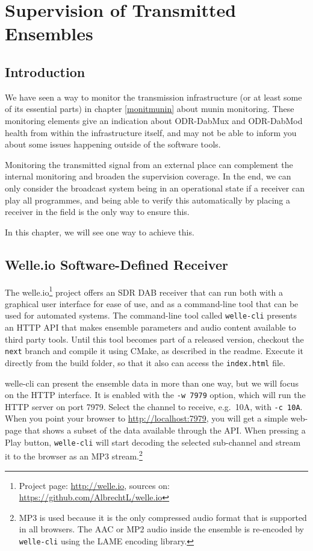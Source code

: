 \section{Supervision of Transmitted Ensembles}
\subsection{Introduction}
We have seen a way to monitor the transmission infrastructure (or at least some
of its essential parts) in chapter \ref{monitmunin} about munin monitoring.
These monitoring elements give an indication about ODR-DabMux and ODR-DabMod
health from within the infrastructure itself, and may not be able to inform you
about some issues happening outside of the software tools.

Monitoring the transmitted signal from an external place can complement the
internal monitoring and broaden the supervision coverage. In the end, we can
only consider the broadcast system being in an operational state if a receiver
can play all programmes, and being able to verify this automatically by placing
a receiver in the field is the only way to ensure this.

In this chapter, we will see one way to achieve this.

\subsection{Welle.io Software-Defined Receiver}
The welle.io\footnote{Project page: \url{http://welle.io}, sources on:
\url{https://github.com/AlbrechtL/welle.io}} project offers an SDR DAB receiver
that can run both with a graphical user interface for ease of use, and as a
command-line tool that can be used for automated systems.
The command-line tool called \texttt{welle-cli} presents an HTTP API that makes
ensemble parameters and audio content available to third party tools. Until this
tool becomes part of a released version, checkout the \texttt{next} branch and
compile it using CMake, as described in the readme. Execute it directly from the
build folder, so that it also can access the \texttt{index.html} file.

welle-cli can present the ensemble data in more than one way, but we will focus
on the HTTP interface. It is enabled with the \texttt{-w 7979} option, which
will run the HTTP server on port 7979. Select the channel to receive, e.g.~10A, with
\texttt{-c 10A}.
When you point your browser to \url{http://localhost:7979}, you will get a
simple web-page that shows a subset of the data available through the API. When
pressing a Play button, \texttt{welle-cli} will start decoding the selected
sub-channel and stream it to the browser as an MP3 stream.\footnote{MP3 is used
because it is the only compressed audio format that is supported in all
browsers. The AAC or MP2 audio inside the ensemble is re-encoded by
\texttt{welle-cli} using the LAME encoding library.}

